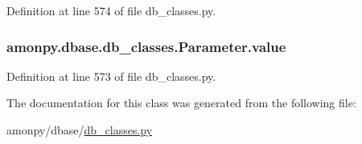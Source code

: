 Definition at line 574 of file db\-\_\-classes.\-py.

\hypertarget{classamonpy_1_1dbase_1_1db__classes_1_1_parameter_ac077e0db5b88e49166cd5066a1ffafe7}{
\subsubsection[{value}]{\setlength{\rightskip}{0pt plus 5cm}amonpy.\-dbase.\-db\-\_\-classes.\-Parameter.\-value}}\label{classamonpy_1_1dbase_1_1db__classes_1_1_parameter_ac077e0db5b88e49166cd5066a1ffafe7}


Definition at line 573 of file db\-\_\-classes.\-py.



The documentation for this class was generated from the following file\-:\begin{DoxyCompactItemize}
\item 
amonpy/dbase/\hyperlink{db__classes_8py}{db\-\_\-classes.\-py}\end{DoxyCompactItemize}
